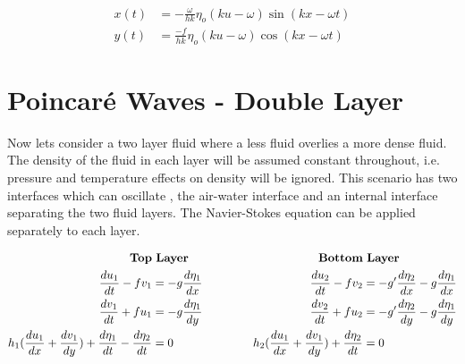 \begin{align}
	x(t) &= -\frac{\omega}{hk}\eta_o(ku-\omega)\sin(kx-\omega t)\\
	y(t) &=\frac{-f}{hk}\eta_o(ku-\omega)\cos(kx-\omega t)
\end{align}




\section{Poincar\'{e} Waves - Double Layer}


Now lets consider a two layer fluid where a less fluid overlies a more dense fluid. The density of the fluid in each layer will
be assumed constant throughout,  i.e. pressure and temperature effects on density will be ignored. This scenario has two interfaces which can oscillate
, the air-water interface and an internal interface separating the two fluid layers. The Navier-Stokes equation can be applied separately to each layer.  


\begin{equation*}
\begin{aligned}[c]
\text{\bf Top} &  \text{ \bf Layer} \\
\frac{d u_1}{dt} -fv_1  &= -g\frac{d \eta_1}{dx}\\
\frac{d v_1}{dt} +fu_1  &= -g\frac{d \eta_1}{dy}\\
h_1(\frac{d u_1}{dx}+\frac{d v_1}{dy})+\frac{d \eta_1}{dt}-\frac{d \eta_2}{dt}  &= 0\\
\end{aligned}
\qquad\ \qquad
\begin{aligned}[c]
\text{\bf Bottom} &  \text{ \bf Layer}  \\
\frac{d u_2}{dt} -fv_2  &= -g^{\prime}\frac{d \eta_2}{dx}-g\frac{d \eta_1}{dx}\\
\frac{d v_2}{dt} +fu_2  &= -g^{\prime}\frac{d \eta_2}{dy}-g\frac{d \eta_1}{dy}\\
h_2(\frac{d u_1}{dx}+\frac{d v_1}{dy})+\frac{d \eta_2}{dt}  &= 0\\
\end{aligned}
\end{equation*}


